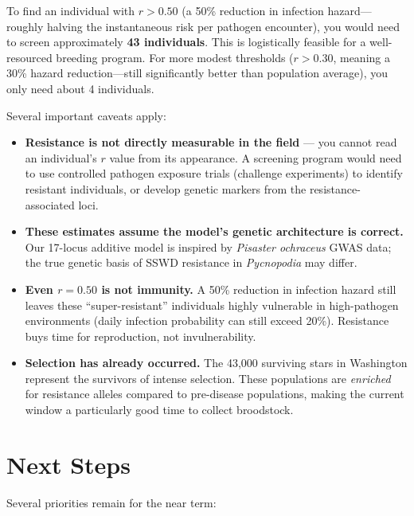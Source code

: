 \documentclass[11pt]{article}
\begin{document}
To find an individual with $r > 0.50$ (a 50\% reduction in infection hazard---roughly halving the instantaneous risk per pathogen encounter), you would need to screen approximately \textbf{43 individuals}. This is logistically feasible for a well-resourced breeding program. For more modest thresholds ($r > 0.30$, meaning a 30\% hazard reduction---still significantly better than population average), you only need about 4 individuals.

Several important caveats apply:

\begin{itemize}[leftmargin=2em]
    \item \textbf{Resistance is not directly measurable in the field} --- you cannot read an individual's $r$ value from its appearance. A screening program would need to use controlled pathogen exposure trials (challenge experiments) to identify resistant individuals, or develop genetic markers from the resistance-associated loci.
    \item \textbf{These estimates assume the model's genetic architecture is correct.} Our 17-locus additive model is inspired by \textit{Pisaster ochraceus} GWAS data; the true genetic basis of SSWD resistance in \textit{Pycnopodia} may differ.
    \item \textbf{Even $r = 0.50$ is not immunity.} A 50\% reduction in infection hazard still leaves these ``super-resistant'' individuals highly vulnerable in high-pathogen environments (daily infection probability can still exceed 20\%). Resistance buys time for reproduction, not invulnerability.
    \item \textbf{Selection has already occurred.} The 43,000 surviving stars in Washington represent the survivors of intense selection. These populations are \textit{enriched} for resistance alleles compared to pre-disease populations, making the current window a particularly good time to collect broodstock.
\end{itemize}

\section{Next Steps}

Several priorities remain for the near term:
\end{document}
